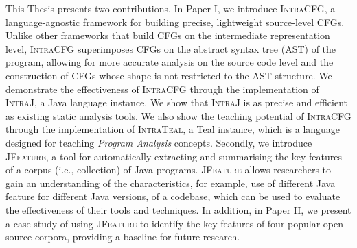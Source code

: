 This Thesis presents two contributions.
In Paper I,  we introduce \textsc{IntraCFG}, a language-agnostic framework for building
precise, lightweight source-level CFGs. Unlike other frameworks that 
build CFGs on the intermediate representation level, \textsc{IntraCFG} superimposes 
CFGs on the abstract syntax tree (AST) of the program, allowing for more accurate 
analysis on the source code level and the construction of CFGs whose shape is not 
restricted to the AST structure. We demonstrate the effectiveness
of \textsc{IntraCFG} through the implementation of \textsc{IntraJ}, a Java language
instance. We show that \textsc{IntraJ} is as precise and efficient as existing 
static analysis tools. We also show the teaching potential of \textsc{IntraCFG} 
through the implementation of \textsc{IntraTeal}, a Teal instance, which
is a language designed for teaching \emph{Program Analysis} concepts.
Secondly, we introduce \textsc{JFeature}, a tool for automatically extracting and summarising
the key features of a corpus (i.e., collection) of Java programs. \textsc{JFeature}
allows researchers to gain an understanding of the characteristics, for example,
use of different Java feature for different Java versions, of a codebase,
which can be used to evaluate the effectiveness of their tools and techniques.
In addition, in Paper II, we present a case study of using \textsc{JFeature} to
identify the key features of four popular open-source corpora, providing a
baseline for future research.







